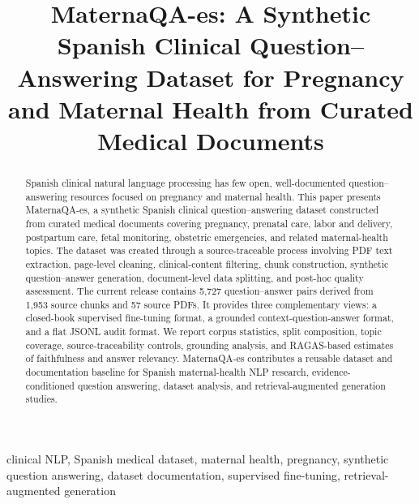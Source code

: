 \documentclass[conference]{IEEEtran}
\begin{document}
\title{MaternaQA-es: A Synthetic Spanish Clinical Question--Answering Dataset for Pregnancy and Maternal Health from Curated Medical Documents}

\author{
}

\maketitle

\begin{abstract}
Spanish clinical natural language processing has few open, well-documented question--answering resources focused on pregnancy and maternal health. This paper presents MaternaQA-es, a synthetic Spanish clinical question--answering dataset constructed from curated medical documents covering pregnancy, prenatal care, labor and delivery, postpartum care, fetal monitoring, obstetric emergencies, and related maternal-health topics. The dataset was created through a source-traceable process involving PDF text extraction, page-level cleaning, clinical-content filtering, chunk construction, synthetic question--answer generation, document-level data splitting, and post-hoc quality assessment. The current release contains 5,727 question--answer pairs derived from 1,953 source chunks and 57 source PDFs. It provides three complementary views: a closed-book supervised fine-tuning format, a grounded context-question-answer format, and a flat JSONL audit format. We report corpus statistics, split composition, topic coverage, source-traceability controls, grounding analysis, and RAGAS-based estimates of faithfulness and answer relevancy. MaternaQA-es contributes a reusable dataset and documentation baseline for Spanish maternal-health NLP research, evidence-conditioned question answering, dataset analysis, and retrieval-augmented generation studies.
\end{abstract}

\begin{IEEEkeywords}
clinical NLP, Spanish medical dataset, maternal health, pregnancy, synthetic question answering, dataset documentation, supervised fine-tuning, retrieval-augmented generation
\end{IEEEkeywords}
\end{document}
